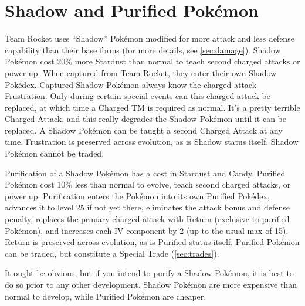 \section{Shadow and Purified Pokémon\label{sec:shadow}}
Team Rocket uses ``Shadow'' Pokémon modified for more attack
 and less defense capability than their base forms (for more details,
 see \autoref{sec:damage}).
Shadow Pokémon cost 20\% more Stardust than normal to teach second charged attacks or power up.
When captured from Team Rocket, they enter their own Shadow Pokédex.
Captured Shadow Pokémon always know the charged attack Frustration.
Only during certain special events can this charged attack be replaced,
 at which time a Charged TM is required as normal.
It's a pretty terrible Charged Attack, and this really degrades the
 Shadow Pokémon until it can be replaced.
A Shadow Pokémon can be taught a second Charged Attack at any time.
Frustration is preserved across evolution, as is Shadow status itself.
Shadow Pokémon cannot be traded.

Purification of a Shadow Pokémon has a cost in Stardust and Candy.
Purified Pokémon cost 10\% less than normal to evolve, teach second charged attacks, or power up.
Purification enters the Pokémon into its own Purified Pokédex,
 advances it to level 25 if not yet there,
 eliminates the attack bonus and defense penalty,
 replaces the primary charged attack with Return (exclusive to purified Pokémon),
 and increases each IV component by 2  (up to the usual max of 15).
Return is preserved across evolution, as is Purified status itself.
Purified Pokémon can be traded, but constitute a Special Trade (\autoref{sec:trades}).

It ought be obvious, but if you intend to purify a Shadow Pokémon, it
  is best to do so prior to any other development.
Shadow Pokémon are more expensive than normal to develop, while Purified Pokémon are cheaper.

